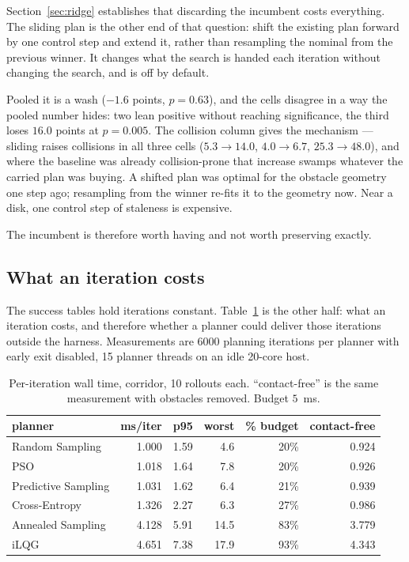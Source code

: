 \documentclass[conference]{IEEEtran}
\begin{document}
Section~\ref{sec:ridge} establishes that discarding the incumbent costs
everything. The sliding plan is the other end of that question: shift the
existing plan forward by one control step and extend it, rather than resampling
the nominal from the previous winner. It changes what the search is handed each
iteration without changing the search, and is off by default.



Pooled it is a wash ($-1.6$ points, $p = 0.63$), and the cells disagree in a way
the pooled number hides: two lean positive without reaching significance, the
third loses $16.0$ points at $p = 0.005$. The collision column gives the
mechanism --- sliding raises collisions in all three cells
($5.3 \rightarrow 14.0$, $4.0 \rightarrow 6.7$, $25.3 \rightarrow 48.0$), and
where the baseline was already collision-prone that increase swamps whatever the
carried plan was buying. A shifted plan was optimal for the obstacle geometry
one step ago; resampling from the winner re-fits it to the geometry now. Near a
disk, one control step of staleness is expensive.

The incumbent is therefore worth having and not worth preserving exactly.

\subsection{What an iteration costs}
\label{sec:timing}

The success tables hold iterations constant. Table~\ref{tab:timing} is the other
half: what an iteration costs, and therefore whether a planner could deliver
those iterations outside the harness. Measurements are 6000 planning iterations
per planner with early exit disabled, 15 planner threads on an idle 20-core
host.

\begin{table}[t]
\caption{Per-iteration wall time, corridor, 10 rollouts each.
``contact-free'' is the same measurement with obstacles removed. Budget $5$~ms.}
\label{tab:timing}
\centering
\begin{tabular}{@{}lrrrrr@{}}
\toprule
planner & ms/iter & p95 & worst & \% budget & contact-free \\
\midrule
Random Sampling      & 1.000 & 1.59 & 4.6  & 20\% & 0.924 \\
PSO                  & 1.018 & 1.64 & 7.8  & 20\% & 0.926 \\
Predictive Sampling  & 1.031 & 1.62 & 6.4  & 21\% & 0.939 \\
Cross-Entropy        & 1.326 & 2.27 & 6.3  & 27\% & 0.986 \\
Annealed Sampling    & 4.128 & 5.91 & 14.5 & 83\% & 3.779 \\
iLQG                 & 4.651 & 7.38 & 17.9 & 93\% & 4.343 \\
\bottomrule
\end{tabular}
\end{table}
\end{document}
